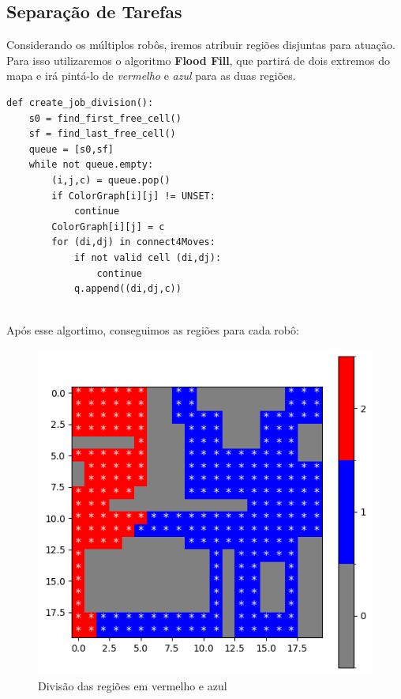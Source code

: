 \documentclass[a4paper, 10pt, conference]{ieeeconf}      %
\begin{document}
\subsection{Separação de Tarefas}
Considerando os múltiplos robôs, iremos atribuir regiões disjuntas para atuação.
Para isso utilizaremos o algoritmo \textbf{Flood Fill}, que partirá de dois extremos
do mapa e irá pintá-lo de \textit{vermelho} e \textit{azul} para as duas regiões.

\lstset{language=Python}
\begin{lstlisting}
def create_job_division():
    s0 = find_first_free_cell()
    sf = find_last_free_cell()
    queue = [s0,sf]
    while not queue.empty:
        (i,j,c) = queue.pop()
        if ColorGraph[i][j] != UNSET:
            continue
        ColorGraph[i][j] = c
        for (di,dj) in connect4Moves:
            if not valid cell (di,dj):
                continue
            q.append((di,dj,c))
        
\end{lstlisting}

Após esse algortimo, conseguimos as regiões para cada robô:

\begin{figure}[htb!]
    \centering
    \includegraphics[scale=0.4]{../home_dirty.png}
    \caption{Divisão das regiões em vermelho e azul}
\end{figure}
\end{document}
